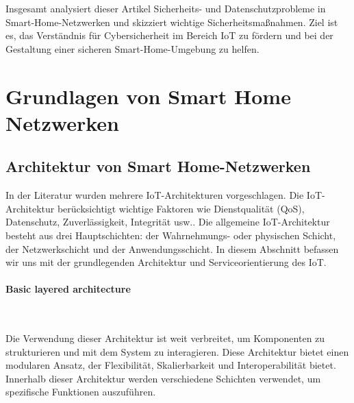 Insgesamt analysiert dieser Artikel Sicherheits- und Datenschutzprobleme in Smart-Home-Netzwerken und skizziert wichtige Sicherheitsmaßnahmen. Ziel ist es, das Verständnis für Cybersicherheit im Bereich IoT zu fördern und bei der Gestaltung einer sicheren Smart-Home-Umgebung zu helfen.


\section{Grundlagen von Smart Home Netzwerken}

\subsection{Architektur von Smart Home-Netzwerken}

In der Literatur wurden mehrere IoT-Architekturen vorgeschlagen. Die IoT-Architektur berücksichtigt wichtige Faktoren wie Dienstqualität (QoS), Datenschutz, Zuverlässigkeit, Integrität usw.\cite{8203943}. 
Die allgemeine IoT-Architektur besteht aus drei Hauptschichten: der  Wahrnehmungs- oder physischen Schicht, der Netzwerkschicht und der Anwendungsschicht. In diesem Abschnitt befassen wir uns mit der grundlegenden Architektur und Serviceorientierung des IoT.

\paragraph{Basic layered architecture}\

Die Verwendung dieser Architektur ist weit verbreitet, um Komponenten zu strukturieren und mit dem System zu interagieren. Diese  Architektur bietet einen modularen Ansatz, der Flexibilität, Skalierbarkeit und Interoperabilität bietet\cite{8203943}. Innerhalb dieser Architektur werden verschiedene Schichten verwendet, um spezifische Funktionen auszuführen.

